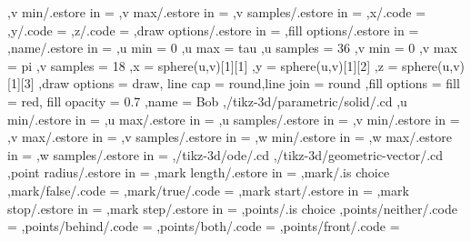 {                ,v min/.estore in = \tikz@td@p@surf@vmin
                ,v max/.estore in = \tikz@td@p@surf@vmax
                ,v samples/.estore in = \tikz@td@p@surf@vsamples
                ,x/.code = {\edef\tikz@td@p@surf@x{#1}}
                ,y/.code = {\edef\tikz@td@p@surf@y{#1}}
                ,z/.code = {\edef\tikz@td@p@surf@z{#1}}
                ,draw options/.estore in = \tikz@td@p@surf@drawoptions
                ,fill options/.estore in = \tikz@td@p@surf@filloptions
                ,name/.estore in = \tikz@td@p@surf@name
                ,u min = 0
                ,u max = tau
                ,u samples = 36
                ,v min = 0
                ,v max = pi
                ,v samples = 18
                ,x = {sphere(u,v)[1][1]}
                ,y = {sphere(u,v)[1][2]}
                ,z = {sphere(u,v)[1][3]}
                ,draw options = {draw, line cap = round,line join = round}
                ,fill options = {fill = red, fill opacity = 0.7}
                ,name = Bob
            ,/tikz-3d/parametric/solid/.cd %
                ,u min/.estore in = \tikz@td@p@s@umin
                ,u max/.estore in = \tikz@td@p@s@umax
                ,u samples/.estore in = \tikz@td@p@s@usamples
                ,v min/.estore in = \tikz@td@p@s@vmin
                ,v max/.estore in = \tikz@td@p@s@vmax
                ,v samples/.estore in = \tikz@td@p@s@vsamples
                ,w min/.estore in = \tikz@td@p@s@wmin
                ,w max/.estore in = \tikz@td@p@s@wmax
                ,w samples/.estore in = \tikz@td@p@s@wsamples
        ,/tikz-3d/ode/.cd %
        ,/tikz-3d/geometric-vector/.cd %
            ,point radius/.estore in = \tikz@td@gm@pointradius
            ,mark length/.estore in = \tikz@td@gm@marklength
            ,mark/.is choice 
                ,mark/false/.code = {\edef\tikz@td@gm@mark{0}}
                ,mark/true/.code = {\edef\tikz@td@gm@mark{1}}
            ,mark start/.estore in = \tikz@td@gm@markstart
            ,mark stop/.estore in = \tikz@td@gm@markstop
            ,mark step/.estore in = \tikz@td@gm@markstep
            ,points/.is choice 
                ,points/neither/.code = {\edef\tikz@td@gm@points{0}}
                ,points/behind/.code = {\edef\tikz@td@gm@points{1}}
                ,points/both/.code = {\edef\tikz@td@gm@points{2}}
                ,points/front/.code = {\edef\tikz@td@gm@points{3}}
}
